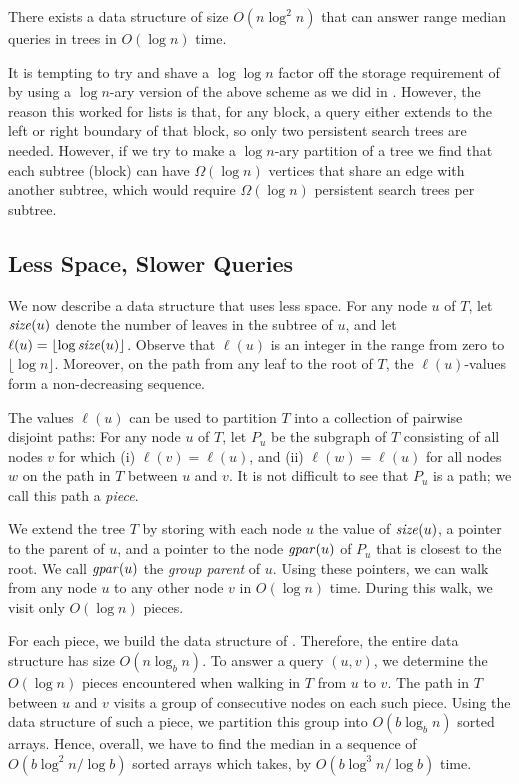 \documentclass{njcarticle}
\newcommand{\size}{\mathord{\it size}}
\newcommand{\gp}{\mathord{\it gpar}}
\begin{document}
\begin{theorem}
There exists a data structure of size $O(n\log^2 n)$ that can answer
range median queries in trees in $O(\log n)$ time. 
\end{theorem}

It is tempting to try and shave a $\log\log n$ factor off the storage
requirement of  by using a $\log n$-ary version of
the above scheme as we did in .  However,
the reason this worked for lists is that, for any block, a query
either extends to the left or right boundary of that block, so only
two persistent search trees are needed.  However, if we try to make a
$\log n$-ary partition of a tree we find that each subtree (block) can
have $\Omega(\log n)$ vertices that share an edge with another
subtree, which would require $\Omega(\log n)$ persistent search trees
per subtree.

\subsection{Less Space, Slower Queries}

We now describe a data structure that uses less space.  For any node
$u$ of $T$, let $\size(u)$ denote the number of leaves in the subtree
of $u$, and let $\ell(u) = \lfloor \log \size(u) \rfloor$.  Observe
that $\ell(u)$ is an integer in the range from zero to $\lfloor \log n
\rfloor$. Moreover, on the path from any leaf to the root of $T$, the
$\ell(u)$-values form a non-decreasing sequence.

The values $\ell(u)$ can be used to partition $T$ into a collection of
pairwise disjoint paths: For any node $u$ of $T$, let $P_u$ be the
subgraph of $T$ consisting of all nodes $v$ for which (i) $\ell(v) =
\ell(u)$, and (ii) $\ell(w) = \ell(u)$ for all nodes $w$ on the path
in $T$ between $u$ and $v$. It is not difficult to see that $P_u$ is a
path; we call this path a \emph{piece}.

We extend the tree $T$ by storing with each node $u$ the value of
$\size(u)$, a pointer to the parent of $u$, and a pointer to the node
$\gp(u)$ of $P_u$ that is closest to the root. We call $\gp(u)$ the
\emph{group parent} of $u$.  Using these pointers, we can walk from
any node $u$ to any other node $v$ in $O(\log n)$ time. During this
walk, we visit only $O(\log n)$ pieces.

For each piece, we build the data structure of
. Therefore, the entire data structure has
size $O(n \log_b n)$.  To answer a query $(u,v)$, we determine the
$O(\log n)$ pieces encountered when walking in $T$ from $u$ to $v$.
The path in $T$ between $u$ and $v$ visits a group of consecutive
nodes on each such piece. Using the data structure of such a piece, we
partition this group into $O(b \log_b n)$ sorted arrays. Hence,
overall, we have to find the median in a sequence of $O(b \log^2 n /
\log b)$ sorted arrays which takes, by 
$O(b \log^3 n / \log b)$ time.
\end{document}
